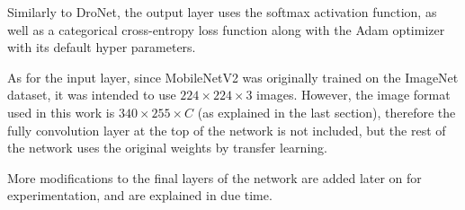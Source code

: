 Similarly to DroNet, the output layer uses the softmax activation function, as
well as a categorical cross-entropy loss function along with the Adam optimizer
with its default hyper parameters.

As for the input layer, since MobileNetV2 was originally trained on the
ImageNet dataset, it was intended to use $224\times224\times3$ images. However,
the image format used in this work is $340\times255\times C$ (as explained in
the last section), therefore the fully convolution layer at the top of the
network is not included, but the rest of the network uses the original weights
by transfer learning.

More modifications to the final layers of the network are added later on for
experimentation, and are explained in due time.
